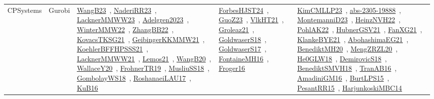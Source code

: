 {\begin{longtable}{lp{3cm}>{\raggedright\arraybackslash}p{6cm}>{\raggedright\arraybackslash}p{6cm}>{\raggedright\arraybackslash}p{8cm}}
CPSystems & Gurobi & \href{works/WangB23.pdf}{WangB23}~\cite{WangB23}, \href{works/NaderiRR23.pdf}{NaderiRR23}~\cite{NaderiRR23}, \href{works/LacknerMMWW23.pdf}{LacknerMMWW23}~\cite{LacknerMMWW23}, \href{works/Adelgren2023.pdf}{Adelgren2023}~\cite{Adelgren2023}, \href{works/WinterMMW22.pdf}{WinterMMW22}~\cite{WinterMMW22}, \href{works/ZhangBB22.pdf}{ZhangBB22}~\cite{ZhangBB22}, \href{works/KovacsTKSG21.pdf}{KovacsTKSG21}~\cite{KovacsTKSG21}, \href{works/GeibingerKKMMW21.pdf}{GeibingerKKMMW21}~\cite{GeibingerKKMMW21}, \href{works/KoehlerBFFHPSSS21.pdf}{KoehlerBFFHPSSS21}~\cite{KoehlerBFFHPSSS21}, \href{works/LacknerMMWW21.pdf}{LacknerMMWW21}~\cite{LacknerMMWW21}, \href{works/Lemos21.pdf}{Lemos21}~\cite{Lemos21}, \href{works/WangB20.pdf}{WangB20}~\cite{WangB20}, \href{works/WallaceY20.pdf}{WallaceY20}~\cite{WallaceY20}, \href{works/FrohnerTR19.pdf}{FrohnerTR19}~\cite{FrohnerTR19}, \href{works/MusliuSS18.pdf}{MusliuSS18}~\cite{MusliuSS18}, \href{works/GombolayWS18.pdf}{GombolayWS18}~\cite{GombolayWS18}, \href{works/RoshanaeiLAU17.pdf}{RoshanaeiLAU17}~\cite{RoshanaeiLAU17}, \href{works/KuB16.pdf}{KuB16}~\cite{KuB16} & \href{works/ForbesHJST24.pdf}{ForbesHJST24}~\cite{ForbesHJST24}, \href{works/GuoZ23.pdf}{GuoZ23}~\cite{GuoZ23}, \href{works/VlkHT21.pdf}{VlkHT21}~\cite{VlkHT21}, \href{works/Groleaz21.pdf}{Groleaz21}~\cite{Groleaz21}, \href{works/GoldwaserS18.pdf}{GoldwaserS18}~\cite{GoldwaserS18}, \href{works/GoldwaserS17.pdf}{GoldwaserS17}~\cite{GoldwaserS17}, \href{works/FontaineMH16.pdf}{FontaineMH16}~\cite{FontaineMH16}, \href{works/Froger16.pdf}{Froger16}~\cite{Froger16} & \href{works/KimCMLLP23.pdf}{KimCMLLP23}~\cite{KimCMLLP23}, \href{works/abs-2305-19888.pdf}{abs-2305-19888}~\cite{abs-2305-19888}, \href{works/MontemanniD23.pdf}{MontemanniD23}~\cite{MontemanniD23}, \href{works/HeinzNVH22.pdf}{HeinzNVH22}~\cite{HeinzNVH22}, \href{works/PohlAK22.pdf}{PohlAK22}~\cite{PohlAK22}, \href{works/HubnerGSV21.pdf}{HubnerGSV21}~\cite{HubnerGSV21}, \href{works/FanXG21.pdf}{FanXG21}~\cite{FanXG21}, \href{works/KlankeBYE21.pdf}{KlankeBYE21}~\cite{KlankeBYE21}, \href{works/AbohashimaEG21.pdf}{AbohashimaEG21}~\cite{AbohashimaEG21}, \href{works/BenediktMH20.pdf}{BenediktMH20}~\cite{BenediktMH20}, \href{works/MengZRZL20.pdf}{MengZRZL20}~\cite{MengZRZL20}, \href{works/He0GLW18.pdf}{He0GLW18}~\cite{He0GLW18}, \href{works/DemirovicS18.pdf}{DemirovicS18}~\cite{DemirovicS18}, \href{works/BenediktSMVH18.pdf}{BenediktSMVH18}~\cite{BenediktSMVH18}, \href{works/TranAB16.pdf}{TranAB16}~\cite{TranAB16}, \href{works/AmadiniGM16.pdf}{AmadiniGM16}~\cite{AmadiniGM16}, \href{works/BurtLPS15.pdf}{BurtLPS15}~\cite{BurtLPS15}, \href{works/PesantRR15.pdf}{PesantRR15}~\cite{PesantRR15}, \href{works/HarjunkoskiMBC14.pdf}{HarjunkoskiMBC14}~\cite{HarjunkoskiMBC14}\\

\end{longtable}}
